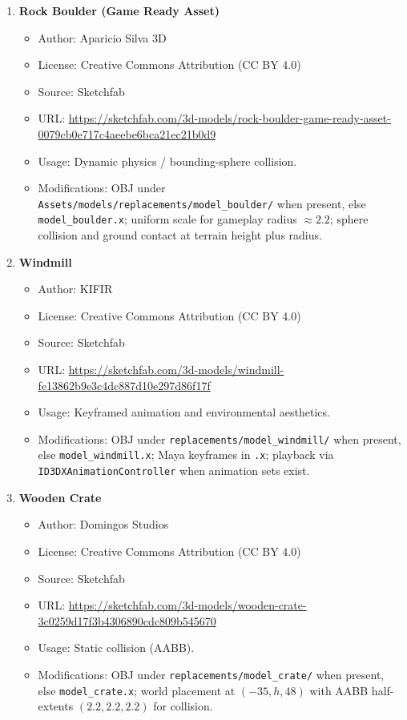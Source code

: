 \documentclass[11pt,a4paper]{article}
\begin{document}
\begin{enumerate}
  \item \textbf{Rock Boulder (Game Ready Asset)}
    \begin{itemize}\setlength\itemsep{2pt}\setlength\parskip{0pt}
      \item Author: Aparicio Silva 3D
      \item License: Creative Commons Attribution (CC BY 4.0)
      \item Source: Sketchfab
      \item URL: \url{https://sketchfab.com/3d-models/rock-boulder-game-ready-asset-0079cb0e717c4aeebe6bca21ec21b0d9}
      \item Usage: Dynamic physics / bounding-sphere collision.
      \item Modifications: OBJ under \texttt{Assets/models/replacements/model\_boulder/} when present, else \texttt{model\_boulder.x}; uniform scale for gameplay radius $\approx 2.2$; sphere collision and ground contact at terrain height plus radius.
    \end{itemize}

  \item \textbf{Windmill}
    \begin{itemize}\setlength\itemsep{2pt}\setlength\parskip{0pt}
      \item Author: KIFIR
      \item License: Creative Commons Attribution (CC BY 4.0)
      \item Source: Sketchfab
      \item URL: \url{https://sketchfab.com/3d-models/windmill-fe13862b9e3c4dc887d10e297d86f17f}
      \item Usage: Keyframed animation and environmental aesthetics.
      \item Modifications: OBJ under \texttt{replacements/model\_windmill/} when present, else \texttt{model\_windmill.x}; Maya keyframes in \texttt{.x}; playback via \texttt{ID3DXAnimationController} when animation sets exist.
    \end{itemize}

  \item \textbf{Wooden Crate}
    \begin{itemize}\setlength\itemsep{2pt}\setlength\parskip{0pt}
      \item Author: Domingos Studios
      \item License: Creative Commons Attribution (CC BY 4.0)
      \item Source: Sketchfab
      \item URL: \url{https://sketchfab.com/3d-models/wooden-crate-3c0259d17f3b4306890cdc809b545670}
      \item Usage: Static collision (AABB).
      \item Modifications: OBJ under \texttt{replacements/model\_crate/} when present, else \texttt{model\_crate.x}; world placement at $(-35, h, 48)$ with AABB half-extents $(2.2,2.2,2.2)$ for collision.
    \end{itemize}
\end{enumerate}
\end{document}
